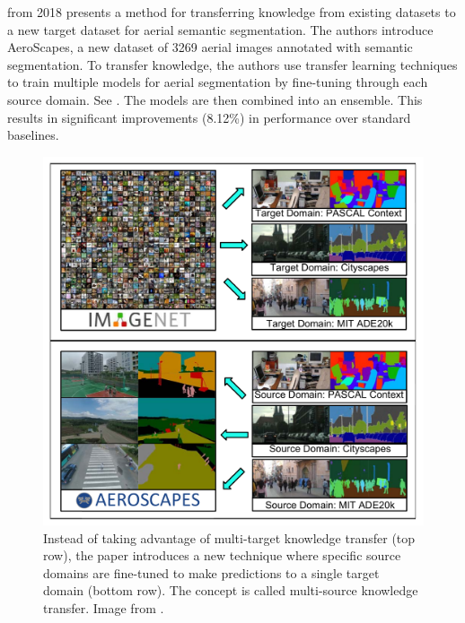  \cite{8354272} from 2018 presents a method for transferring knowledge from existing datasets to a new target dataset for aerial semantic segmentation. The authors introduce AeroScapes, a new dataset of 3269 aerial images annotated with semantic segmentation. To transfer knowledge, the authors use transfer learning techniques to train multiple models for aerial segmentation by fine-tuning through each source domain. See . The models are then combined into an ensemble. This results in significant improvements (8.12\%) in performance over standard baselines.
\begin{figure}[H]%
    \centering
    \includegraphics[width=\imgWidthXL]{images/ensemble_knowledge_transfer.png}
    \caption[Multi-target and single-target knowledge]{Instead of taking advantage of multi-target knowledge transfer (top row), the paper introduces a new technique where specific source domains are fine-tuned to make predictions to a single target domain (bottom row). The concept is called multi-source knowledge transfer. Image from \cite{8354272}.}
    \label{ensemble_knowledge_transfer}
\end{figure}

